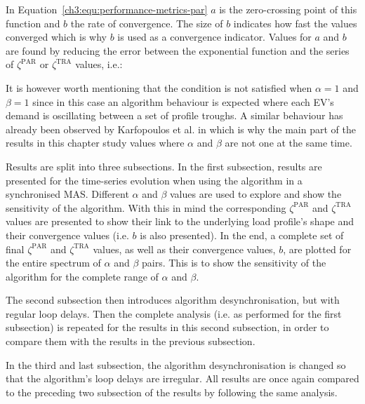 

In Equation~\ref{ch3:equ:performance-metrics-par} $a$ is the zero-crossing point of this function and $b$ the rate of convergence.
The size of $b$ indicates how fast the values converged which is why $b$ is used as a convergence indicator.
Values for $a$ and $b$ are found by reducing the error between the exponential function and the series of $\zeta^\text{PAR}$ or $\zeta^\text{TRA}$ values, i.e.:



It is however worth mentioning that the condition is not satisfied when $\alpha = 1$ and $\beta = 1$ since in this case an algorithm behaviour is expected where each EV's demand is oscillating between a set of profile troughs.
A similar behaviour has already been observed by Karfopoulos et al. in \cite{Karfopoulos2013} which is why the main part of the results in this chapter study values where $\alpha$ and $\beta$ are not one at the same time.

Results are split into three subsections.
In the first subsection, results are presented for the time-series evolution when using the algorithm in a synchronised MAS.
Different $\alpha$ and $\beta$ values are used to explore and show the sensitivity of the algorithm.
With this in mind the corresponding $\zeta^\text{PAR}$ and $\zeta^\text{TRA}$ values are presented to show their link to the underlying load profile's shape and their convergence values (i.e. $b$ is also presented).
In the end, a complete set of final $\zeta^\text{PAR}$ and $\zeta^\text{TRA}$ values, as well as their convergence values, $b$, are plotted for the entire spectrum of $\alpha$ and $\beta$ pairs.
This is to show the sensitivity of the algorithm for the complete range of $\alpha$ and $\beta$.

The second subsection then introduces algorithm desynchronisation, but with regular loop delays.
Then the complete analysis (i.e. as performed for the first subsection) is repeated for the results in this second subsection, in order to compare them with the results in the previous subsection.

In the third and last subsection, the algorithm desynchronisation is changed so that the algorithm's loop delays are irregular.
All results are once again compared to the preceding two subsection of the results by following the same analysis.



